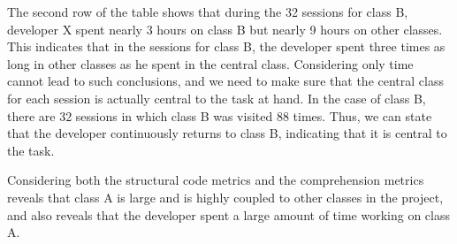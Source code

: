 The second row of the table shows that during the 32 sessions for class B, developer X spent nearly 3 hours on class B but nearly 9 hours on other classes. This indicates that in the sessions for class B, the developer spent three times as long in other classes as he spent in the central class. Considering only time cannot lead to such conclusions, and we need to make sure that the central class for each session is actually central to the task at hand. In the case of class B, there are 32 sessions in which class B was visited 88 times. Thus, we can state that the developer continuously returns to class B, indicating that it is central to the task. 


Considering both the structural code metrics and the comprehension metrics reveals that class A is large and is highly coupled to other classes in the project, and also reveals that the developer spent a large amount of time working on class A.

